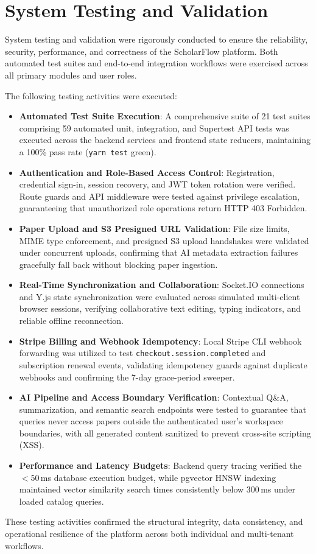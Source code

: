\section{System Testing and Validation}
System testing and validation were rigorously conducted to ensure the reliability, security, performance, and correctness of the ScholarFlow platform. Both automated test suites and end-to-end integration workflows were exercised across all primary modules and user roles.

The following testing activities were executed:
\begin{itemize}
\item \textbf{Automated Test Suite Execution}: A comprehensive suite of 21 test suites comprising 59 automated unit, integration, and Supertest API tests was executed across the backend services and frontend state reducers, maintaining a 100\% pass rate (\texttt{yarn test} green).
\item \textbf{Authentication and Role-Based Access Control}: Registration, credential sign-in, session recovery, and JWT token rotation were verified. Route guards and API middleware were tested against privilege escalation, guaranteeing that unauthorized role operations return HTTP 403 Forbidden.
\item \textbf{Paper Upload and S3 Presigned URL Validation}: File size limits, MIME type enforcement, and presigned S3 upload handshakes were validated under concurrent uploads, confirming that AI metadata extraction failures gracefully fall back without blocking paper ingestion.
\item \textbf{Real-Time Synchronization and Collaboration}: Socket.IO connections and Y.js state synchronization were evaluated across simulated multi-client browser sessions, verifying collaborative text editing, typing indicators, and reliable offline reconnection.
\item \textbf{Stripe Billing and Webhook Idempotency}: Local Stripe CLI webhook forwarding was utilized to test \texttt{checkout.session.completed} and subscription renewal events, validating idempotency guards against duplicate webhooks and confirming the 7-day grace-period sweeper.
\item \textbf{AI Pipeline and Access Boundary Verification}: Contextual Q\&A, summarization, and semantic search endpoints were tested to guarantee that queries never access papers outside the authenticated user's workspace boundaries, with all generated content sanitized to prevent cross-site scripting (XSS).
\item \textbf{Performance and Latency Budgets}: Backend query tracing verified the $<$50\,ms database execution budget, while pgvector HNSW indexing maintained vector similarity search times consistently below 300\,ms under loaded catalog queries.
\end{itemize}

These testing activities confirmed the structural integrity, data consistency, and operational resilience of the platform across both individual and multi-tenant workflows.
